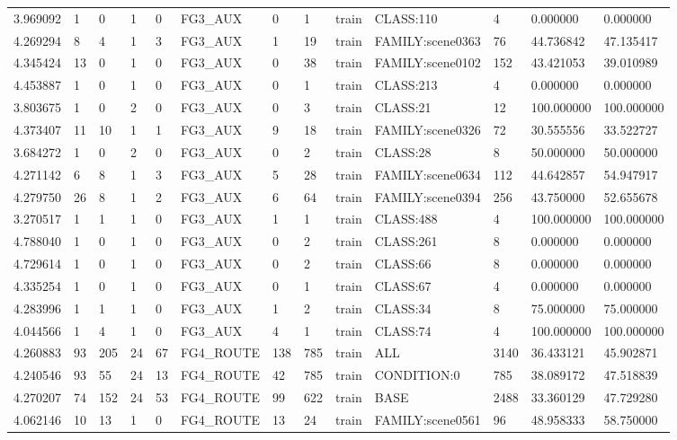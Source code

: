 \begin{tabular}{lllllllllllll}
3.969092 & 1 & 0 & 1 & 0 & FG3\_AUX & 0 & 1 & train & CLASS:110 & 4 & 0.000000 & 0.000000 \\
4.269294 & 8 & 4 & 1 & 3 & FG3\_AUX & 1 & 19 & train & FAMILY:scene0363 & 76 & 44.736842 & 47.135417 \\
4.345424 & 13 & 0 & 1 & 0 & FG3\_AUX & 0 & 38 & train & FAMILY:scene0102 & 152 & 43.421053 & 39.010989 \\
4.453887 & 1 & 0 & 1 & 0 & FG3\_AUX & 0 & 1 & train & CLASS:213 & 4 & 0.000000 & 0.000000 \\
3.803675 & 1 & 0 & 2 & 0 & FG3\_AUX & 0 & 3 & train & CLASS:21 & 12 & 100.000000 & 100.000000 \\
4.373407 & 11 & 10 & 1 & 1 & FG3\_AUX & 9 & 18 & train & FAMILY:scene0326 & 72 & 30.555556 & 33.522727 \\
3.684272 & 1 & 0 & 2 & 0 & FG3\_AUX & 0 & 2 & train & CLASS:28 & 8 & 50.000000 & 50.000000 \\
4.271142 & 6 & 8 & 1 & 3 & FG3\_AUX & 5 & 28 & train & FAMILY:scene0634 & 112 & 44.642857 & 54.947917 \\
4.279750 & 26 & 8 & 1 & 2 & FG3\_AUX & 6 & 64 & train & FAMILY:scene0394 & 256 & 43.750000 & 52.655678 \\
3.270517 & 1 & 1 & 1 & 0 & FG3\_AUX & 1 & 1 & train & CLASS:488 & 4 & 100.000000 & 100.000000 \\
4.788040 & 1 & 0 & 1 & 0 & FG3\_AUX & 0 & 2 & train & CLASS:261 & 8 & 0.000000 & 0.000000 \\
4.729614 & 1 & 0 & 1 & 0 & FG3\_AUX & 0 & 2 & train & CLASS:66 & 8 & 0.000000 & 0.000000 \\
4.335254 & 1 & 0 & 1 & 0 & FG3\_AUX & 0 & 1 & train & CLASS:67 & 4 & 0.000000 & 0.000000 \\
4.283996 & 1 & 1 & 1 & 0 & FG3\_AUX & 1 & 2 & train & CLASS:34 & 8 & 75.000000 & 75.000000 \\
4.044566 & 1 & 4 & 1 & 0 & FG3\_AUX & 4 & 1 & train & CLASS:74 & 4 & 100.000000 & 100.000000 \\
4.260883 & 93 & 205 & 24 & 67 & FG4\_ROUTE & 138 & 785 & train & ALL & 3140 & 36.433121 & 45.902871 \\
4.240546 & 93 & 55 & 24 & 13 & FG4\_ROUTE & 42 & 785 & train & CONDITION:0 & 785 & 38.089172 & 47.518839 \\
4.270207 & 74 & 152 & 24 & 53 & FG4\_ROUTE & 99 & 622 & train & BASE & 2488 & 33.360129 & 47.729280 \\
4.062146 & 10 & 13 & 1 & 0 & FG4\_ROUTE & 13 & 24 & train & FAMILY:scene0561 & 96 & 48.958333 & 58.750000 \\

\end{tabular}
